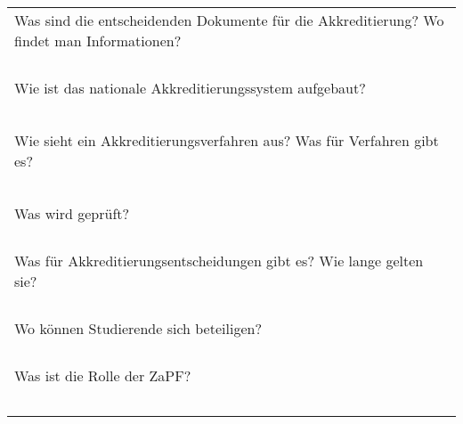 \documentclass{scrartcl}
\begin{document}
\begin{tabular}{p{}}
Was sind die entscheidenden Dokumente für die Akkreditierung? Wo findet man Informationen? \\
\\
\hline\\
\hline\\
\hline\\

Wie ist das nationale Akkreditierungssystem aufgebaut?\\
\\
\\
\\
\\
\\
Wie sieht ein Akkreditierungsverfahren aus? Was für Verfahren gibt es?\\
\\
\\
\\
\\
\\
Was wird geprüft?\\
\\
\hline\\
\hline\\
\hline\\
Was für Akkreditierungsentscheidungen gibt es? Wie lange gelten sie?\\
\\
\hline\\
\hline\\
\hline\\
Wo können Studierende sich beteiligen?\\
\\
\hline\\
\hline\\
\hline\\
Was ist die Rolle der ZaPF?\\
\\
\hline\\
\hline\\
\hline\\
\hline\\

\end{tabular}
\end{document}
